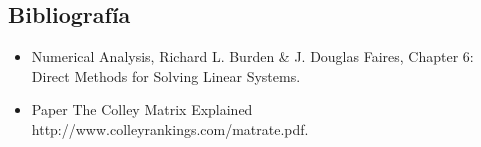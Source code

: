 \subsection{Bibliografía}

\begin{itemize}
 \item Numerical Analysis, Richard L. Burden \& J. Douglas Faires, Chapter 6: Direct Methods for Solving Linear Systems.
 \item Paper The Colley Matrix Explained http://www.colleyrankings.com/matrate.pdf.
\end{itemize}
